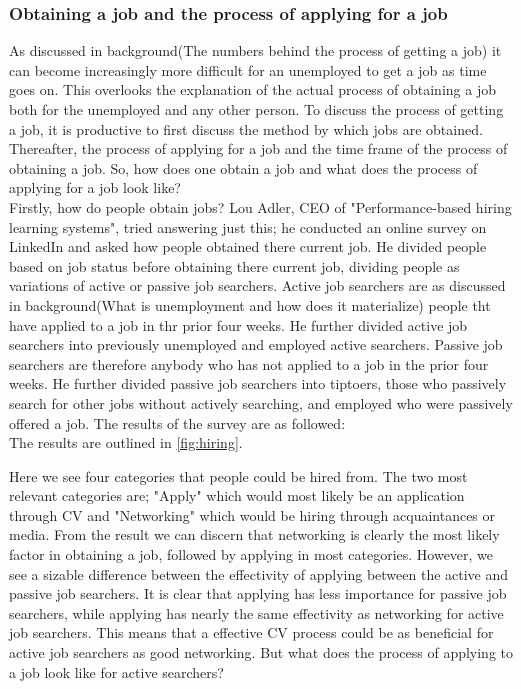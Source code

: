 \subsubsection{Obtaining a job and the process of applying for a job}
As discussed in background(The numbers behind the process of getting a job) it can become increasingly more difficult for an unemployed to get a job as time goes on.
This overlooks the explanation of the actual process of obtaining a job both for the unemployed and any other person.
To discuss the process of getting a job, it is productive to first discuss the method by which jobs are obtained.
Thereafter, the process of applying for a job and the time frame of the process of obtaining a job.
So, how does one obtain a job and what does the process of applying for a job look like? \\

Firstly, how do people obtain jobs?
Lou Adler, CEO of "Performance-based hiring learning systems", tried answering just this; he conducted an online survey on LinkedIn and asked how people obtained there current job.
He divided people based on job status before obtaining there current job, dividing people as variations of active or passive job searchers.
Active job searchers are as discussed in background(What is unemployment and how does it materialize) people tht have applied to a job in thr prior four weeks.
He further divided active job searchers into previously unemployed and employed active searchers.
Passive job searchers are therefore anybody who has not applied to a job in the prior four weeks.
He further divided passive job searchers into tiptoers, those who passively search for other jobs without actively searching, and employed who were passively offered a job.
The results of the survey are as followed: \\

The results are outlined in \vref{fig:hiring}.

Here we see four categories that people could be hired from.
The two most relevant categories are; "Apply" which would most likely be an application through CV and "Networking" which would be hiring through acquaintances or media.
From the result we can discern that networking is clearly the most likely factor in obtaining a job, followed by applying in most categories.
However, we see a sizable difference between the effectivity of applying between the active and passive job searchers. 
It is clear that applying has less importance for passive job searchers, while applying has nearly the same effectivity as networking for active job searchers. 
This means that a effective CV process could be as beneficial for active job searchers as good networking.
But what does the process of applying to a job look like for active searchers? \\

